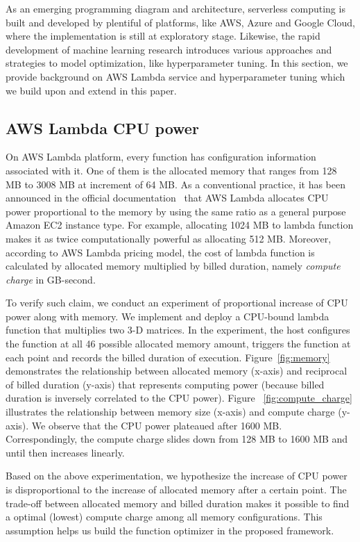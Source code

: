 As an emerging programming diagram and architecture, serverless computing is built and developed by plentiful of platforms, like AWS, Azure and Google Cloud, where the implementation is still at exploratory stage. Likewise, the rapid development of machine learning research introduces various approaches and strategies to model optimization, like hyperparameter tuning. In this section, we provide background on AWS Lambda service and hyperparameter tuning which we build upon and extend in this paper.

\subsection{AWS Lambda CPU power}

On AWS Lambda platform, every function has configuration information associated with it. One of them is the allocated memory that ranges from 128 MB to 3008 MB at increment of 64 MB. As a conventional practice, it has been announced in the official documentation~\cite{ref:lambdalimits} that AWS Lambda allocates CPU power proportional to the memory by using the same ratio as a general purpose Amazon EC2 instance type. For example, allocating 1024 MB to lambda function makes it as twice computationally powerful as allocating 512 MB. Moreover, according to AWS Lambda pricing model, the cost of lambda function is calculated by allocated memory multiplied by billed duration, namely \textit{compute charge} in GB-second.

To verify such claim, we conduct an experiment of proportional increase of CPU power along with memory. We implement and deploy a CPU-bound lambda function that multiplies two 3-D matrices. In the experiment, the host configures the function at all 46 possible allocated memory amount, triggers the function at each point and records the billed duration of execution. Figure~\ref{fig:memory} demonstrates the relationship between allocated memory (x-axis) and reciprocal of billed duration (y-axis) that represents computing power (because billed duration is inversely correlated to the CPU power). Figure ~\ref{fig:compute_charge} illustrates the relationship between memory size (x-axis) and compute charge (y-axis). We observe that the CPU power plateaued after 1600 MB. Correspondingly, the compute charge slides down from 128 MB to 1600 MB and until then increases linearly. 

Based on the above experimentation, we hypothesize the increase of CPU power is disproportional to the increase of allocated memory after a certain point. The trade-off between allocated memory and billed duration makes it possible to find a optimal (lowest) compute charge among all memory configurations. This assumption helps us build the function optimizer in the proposed framework.

